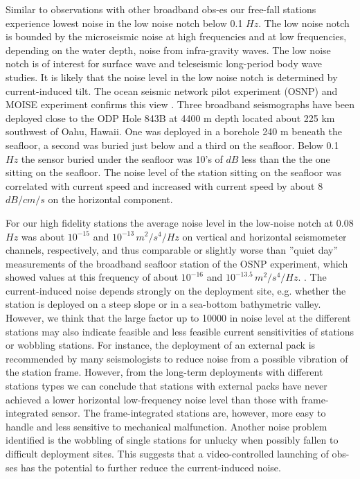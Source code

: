 \documentclass{article}
\begin{document}
{Similar to observations with other broadband obs-es 
our free-fall stations experience lowest noise 
in the low noise notch below 0.1 $Hz$.
The low noise notch is bounded by 
the microseismic noise at high frequencies
and at low frequencies, 
depending on the water depth,
noise from infra-gravity waves. 
The low noise notch is of interest for 
surface wave and teleseismic long-period body wave studies.
It is likely that the 
noise level in the low noise notch is 
determined by current-induced tilt.
The ocean seismic network pilot experiment (OSNP) and MOISE experiment
 confirms this
view \cite[][]{collins:01,stephen:03,stutzmann:01}.
Three broadband seismographs have been deployed 
close to the ODP Hole 843B at 4400 m depth
located about 225 km southwest of Oahu, Hawaii.
One was deployed in a borehole 240 m beneath the seafloor,
a second was buried just below and a third on the seafloor.
Below 0.1 $Hz$ the sensor buried under the seafloor 
was 10's of $dB$ less than the the one sitting on the seafloor.
The noise level of the station sitting on the seafloor
was correlated with current speed and 
increased with current speed 
by about 8 $dB / cm/s$ on the horizontal component.

For our high fidelity  stations the 
average noise level in the low-noise notch at 0.08 $Hz$ was about
$10^{-15}$ and 
$10^{-13}\, m^2/s^4 / Hz$ on vertical and horizontal 
seismometer channels, respectively,
and thus comparable or slightly worse than 
''quiet day'' measurements of the broadband seafloor station of the OSNP 
experiment, which showed 
values at this frequency of about
$10^{-16}$ and 
$10^{-13.5}\, m^2/s^4 / Hz$.
\cite[see][]{stephen:03}.
The current-induced noise depends strongly on the deployment site, e.g. whether the 
station is deployed on a steep slope or in a sea-bottom bathymetric valley. 
However, we think that the large factor up to 10000 in noise level at the different 
stations may also indicate feasible and less feasible current sensitivities of stations
or wobbling stations.
For instance, the deployment of an external pack is recommended  by many 
seismologists to reduce noise from a possible vibration of the station frame.
However, from the long-term deployments with different stations types we can conclude that 
stations with external packs have never achieved a lower horizontal low-frequency 
noise level than those with frame-integrated sensor.
The frame-integrated stations are, however, more easy to handle and less sensitive to mechanical
malfunction.
Another noise problem identified is the wobbling of single stations for unlucky
when possibly fallen to difficult deployment sites.
This suggests that a video-controlled launching of obs-ses has the potential to further 
reduce the current-induced noise.

}
\end{document}
